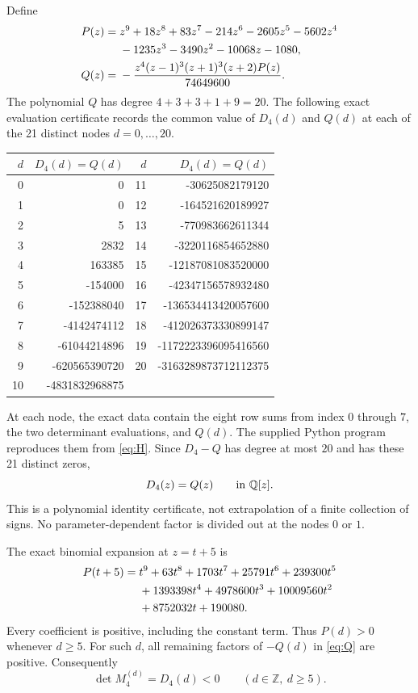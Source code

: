 \documentclass[11pt]{article}
\newcommand{\Z}{\mathbb Z}
\newcommand{\Q}{\mathbb Q}
\begin{document}
Define
\begin{align}
 P(z)={}&z^9+18z^8+83z^7-214z^6-2605z^5-5602z^4\notag\\
       &-1235z^3-3490z^2-10068z-1080,\label{eq:P}\\
 Q(z)={}&-\frac{z^4(z-1)^3(z+1)^3(z+2)P(z)}{74649600}.
                                                    \label{eq:Q}
\end{align}
The polynomial $Q$ has degree $4+3+3+1+9=20$.
The following exact evaluation certificate records the common value
of $D_4(d)$ and $Q(d)$ at each of the 21 distinct nodes $d=0,\ldots,20$.
\begin{center}\small
\begin{tabular}{r|r@{\qquad}r|r}
$d$&$D_4(d)=Q(d)$&$d$&$D_4(d)=Q(d)$\\\hline
0&0&11&-30625082179120\\
1&0&12&-164521620189927\\
2&5&13&-770983662611344\\
3&2832&14&-3220116854652880\\
4&163385&15&-12187081083520000\\
5&-154000&16&-42347156578932480\\
6&-152388040&17&-136534413420057600\\
7&-4142474112&18&-412026373330899147\\
8&-61044214896&19&-1172223396095416560\\
9&-620565390720&20&-3163289873712112375\\
10&-4831832968875&&
\end{tabular}
\end{center}
At each node, the exact data contain the eight row sums from index
$0$ through $7$, the two determinant evaluations, and $Q(d)$.
The supplied Python program reproduces them from \eqref{eq:H}.
Since $D_4-Q$ has degree at most $20$ and has these 21 distinct zeros,
\begin{equation}\label{eq:identity}
 D_4(z)=Q(z)\qquad\hbox{in }\Q[z].
\end{equation}
This is a polynomial identity certificate, not extrapolation of a
finite collection of signs. No parameter-dependent factor is divided
out at the nodes $0$ or $1$.

The exact binomial expansion at $z=t+5$ is
\begin{align}
 P(t+5)={}&t^9+63t^8+1703t^7+25791t^6+239300t^5\notag\\
 &+1393398t^4+4978600t^3+10009560t^2\notag\\
 &+8752032t+190080.\label{eq:positive-shift}
\end{align}
Every coefficient is positive, including the constant term.
Thus $P(d)>0$ whenever $d\geq5$. For such $d$, all remaining
factors of $-Q(d)$ in \eqref{eq:Q} are positive. Consequently
\begin{equation}\label{eq:all-negative}
 \det M_4^{(d)}=D_4(d)<0\qquad(d\in\Z,\ d\geq5).
\end{equation}
\end{document}
